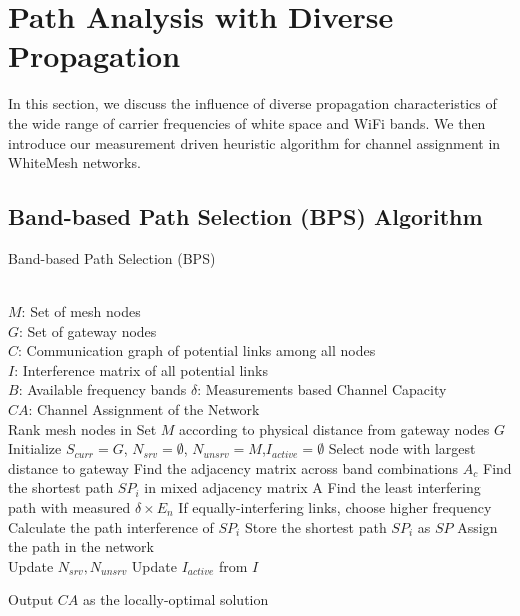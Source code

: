 \section{Path Analysis with Diverse Propagation}
\label{sec:wmalgorithms}


In this section, we discuss the influence of diverse propagation
characteristics of the wide range of carrier frequencies of
white space and WiFi bands. We then introduce our measurement 
driven heuristic algorithm for channel assignment in 
WhiteMesh networks.



\subsection{Band-based Path Selection (BPS) Algorithm}
\label{subsec:BPS}

\begin{algorithm}[t]
    \small
\caption{Band-based Path Selection (BPS)}
\label{algorithms:bps}
\begin{algorithmic}[1]
\REQUIRE  ~~\\
	$M$: Set of mesh nodes\\
	$G$: Set of gateway nodes\\
	$C$: Communication graph of potential links among all nodes\\
	$I$: Interference matrix of all potential links \\
	$B$: Available frequency bands
	$\delta$: Measurements based Channel Capacity
\ENSURE ~~\\    
$CA$: Channel Assignment of the Network\\
\STATE Rank mesh nodes in Set $M$ according to physical distance from gateway nodes $G$
\STATE Initialize $S_{curr}=G$, $N_{srv}=\emptyset$, $N_{unsrv}=M$,$I_{active}=\emptyset$
\STATE Select node with largest distance to gateway
\STATE Find the adjacency matrix across band combinations $A_c$
\STATE Find the shortest path $SP_i$ in mixed adjacency matrix A 
\STATE Find the least interfering path with measured $\delta \times E_n$
\STATE If equally-interfering links, choose higher frequency
\STATE Calculate the path interference of $SP_i$
\ENDFOR
\STATE Store the shortest path $SP_i$ as $SP$
\ENDFOR
\STATE Assign the path in the network\\
		\STATE Update $N_{srv},N_{unsrv}$
		\STATE Update $I_{active}$ from $I$
\ENDWHILE 

Output $CA$ as the locally-optimal solution\\
\end{algorithmic}
\end{algorithm}

